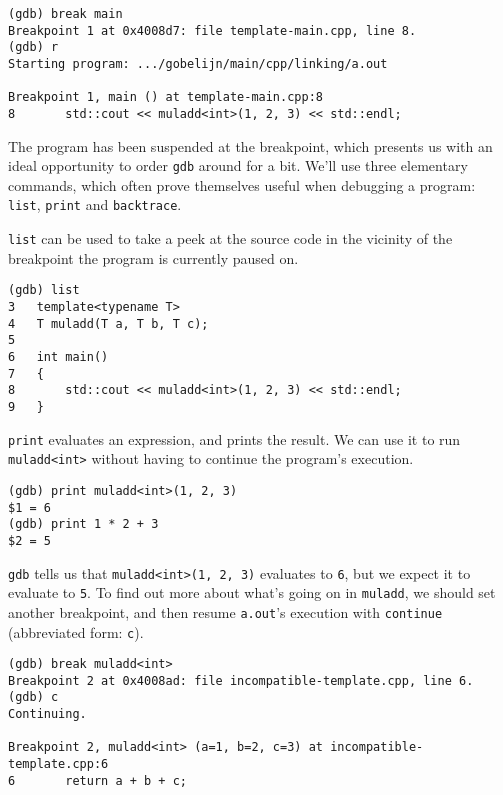 \documentclass[12pt,a4paper]{article}
\newcommand{\gdb}{\texttt{gdb}}
\newcommand{\labelname}[1]{\texttt{#1}}
\newcommand{\functionname}[1]{\labelname{#1}}
\newcommand{\filename}[1]{\texttt{#1}}
\begin{document}
\begin{lstlisting}[caption={running \filename{a.out} in \gdb{}, with a breakpoint}]
(gdb) break main
Breakpoint 1 at 0x4008d7: file template-main.cpp, line 8.
(gdb) r
Starting program: .../gobelijn/main/cpp/linking/a.out 

Breakpoint 1, main () at template-main.cpp:8
8	    std::cout << muladd<int>(1, 2, 3) << std::endl;
\end{lstlisting}

The program has been suspended at the breakpoint, which presents us with an ideal opportunity to order \gdb{} around for a bit. We'll use three elementary commands, which often prove themselves useful when debugging a program: \functionname{list}, \functionname{print} and \functionname{backtrace}.

\functionname{list} can be used to take a peek at the source code in the vicinity of the breakpoint the program is currently paused on.\\

\begin{lstlisting}[caption={using \functionname{list} to print relevant source code}]
(gdb) list
3	template<typename T>
4	T muladd(T a, T b, T c);
5	
6	int main()
7	{
8	    std::cout << muladd<int>(1, 2, 3) << std::endl;
9	}
\end{lstlisting}

\noindent \functionname{print} evaluates an expression, and prints the result. We can use it to run \functionname{muladd<int>} without having to continue the program's execution.\\

\begin{lstlisting}[caption={using the \functionname{print} command}]
(gdb) print muladd<int>(1, 2, 3)
$1 = 6
(gdb) print 1 * 2 + 3
$2 = 5
\end{lstlisting}

\noindent \gdb{} tells us that \functionname{muladd<int>(1, 2, 3)} evaluates to \texttt{6}, but we expect it to evaluate to \texttt{5}. To find out more about what's going on in \functionname{muladd}, we should set another breakpoint, and then resume \filename{a.out}'s execution with \functionname{continue} (abbreviated form: \texttt{c}).\\

\begin{lstlisting}[caption={adding another breakpoint}]
(gdb) break muladd<int>
Breakpoint 2 at 0x4008ad: file incompatible-template.cpp, line 6.
(gdb) c
Continuing.

Breakpoint 2, muladd<int> (a=1, b=2, c=3) at incompatible-template.cpp:6
6	    return a + b + c;
\end{lstlisting}
\end{document}
